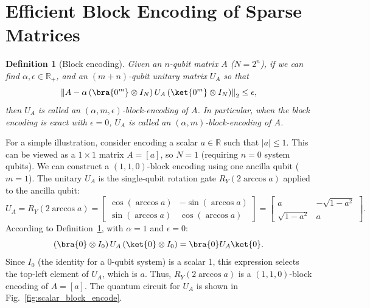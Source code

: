 \documentclass{article}
\newtheorem{definition}{Definition}[section]
\begin{document}
    \section{Efficient Block Encoding of Sparse Matrices}\label{sec:block_encoding}
    \begin{definition}[Block encoding]
        \label{def:block_encoding}
        Given an $n$-qubit matrix $A$ ($N = 2^n$), if we can find $\alpha, \epsilon \in \mathbb{R}_+$, and an $(m + n)$-qubit unitary matrix $U_A$ so that
        \begin{equation}
            \left\| A - \alpha \left( \bra{0^m} \otimes I_N \right) U_A \left( \ket{0^m} \otimes I_N \right) \right\|_2 \leq \epsilon,\label{eq:equation2}
        \end{equation}
        then $U_A$ is called an $(\alpha, m, \epsilon)$-block-encoding of $A$. In particular, when the block encoding is exact with $\epsilon = 0$, $U_A$ is called an $(\alpha, m)$-block-encoding of $A$.
    \end{definition}

    For a simple illustration, consider encoding a scalar $a \in \mathbb{R}$ such that $|a| \leq 1$. This can be viewed as a $1 \times 1$ matrix $A=[a]$, so $N=1$ (requiring $n=0$ system qubits). We can construct a $(1, 1, 0)$-block encoding using one ancilla qubit ($m=1$). The unitary $U_A$ is the single-qubit rotation gate $R_Y(2 \arccos a)$ applied to the ancilla qubit:
    \begin{equation}
        U_A = R_Y(2 \arccos a) =
        \begin{bmatrix}
            \cos(\arccos a) & -\sin(\arccos a) \\ \sin(\arccos a) & \cos(\arccos a)
        \end{bmatrix} =
        \begin{bmatrix}
            a & -\sqrt{1-a^2} \\ \sqrt{1-a^2} & a
        \end{bmatrix}.\label{eq:equation3}
    \end{equation}
    According to Definition~\ref{def:block_encoding}, with $\alpha=1$ and $\epsilon=0$:
    $$ \left( \bra{0} \otimes I_0 \right) U_A \left( \ket{0} \otimes I_0 \right) = \bra{0} U_A \ket{0}. $$
    Since $I_0$ (the identity for a 0-qubit system) is a scalar 1, this expression selects the top-left element of $U_A$, which is $a$. Thus, $R_Y(2 \arccos a)$ is a $(1,1,0)$-block encoding of $A=[a]$. The quantum circuit for $U_A$ is shown in Fig.~\ref{fig:scalar_block_encode}.
\end{document}
